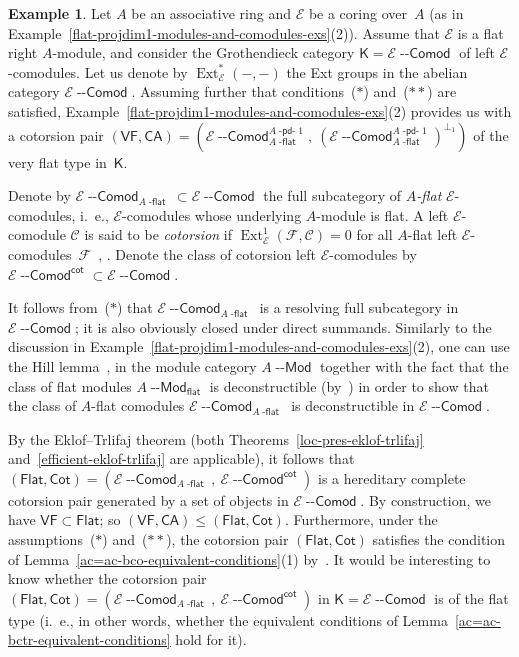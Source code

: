 \documentclass[12pt,a4paper]{amsart}
\newcommand{\+}{\nobreakdash-}
\renewcommand{\:}{\colon}
\DeclareMathOperator{\Ext}{Ext}
\newcommand{\Modl}{{\operatorname{\mathsf{--Mod}}}}
\newcommand{\Comodl}{{\operatorname{\mathsf{--Comod}}}}
\newcommand{\sK}{\mathsf K}
\newcommand{\cF}{\mathcal F}
\newcommand{\cC}{\mathcal C}
\newcommand{\cE}{\mathcal E}
\newcommand{\VF}{\mathsf{VF}}
\newcommand{\CA}{\mathsf{CA}}
\newcommand{\Flat}{\mathsf{Flat}}
\newcommand{\Cot}{\mathsf{Cot}}
\renewcommand{\flat}{\mathsf{flat}}
\renewcommand{\cot}{\mathsf{cot}}
\newcommand{\dpdo}{{{\operatorname{\mathsf{-pd-}}}1}}
\newcommand{\dflat}{{\operatorname{\mathsf{-flat}}}}
\theoremstyle{plain}
\theoremstyle{definition}
\newtheorem{ex}[thm]{Example}
\begin{document}
\begin{ex} \label{flat-cotorsion-pair-in-comodules-flat-type}
 Let $A$ be an associative ring and $\cE$ be a coring over~$A$
(as in Example~\ref{flat-projdim1-modules-and-comodules-exs}(2)).
 Assume that $\cE$ is a flat right $A$\+module, and consider
the Grothendieck category $\sK=\cE\Comodl$ of left $\cE$\+comodules.
 Let us denote by $\Ext_\cE^*({-},{-})$ the Ext groups in the abelian
category $\cE\Comodl$.
 Assuming further that conditions~($*$) and~(${*}{*}$) are
satisfied, Example~\ref{flat-projdim1-modules-and-comodules-exs}(2)
provides us with a cotorsion pair $(\VF,\CA)=
(\cE\Comodl^{A\dpdo}_{A\dflat},\allowbreak\>
(\cE\Comodl^{A\dpdo}_{A\dflat})^{\perp_1})$ of the very flat
type in~$\sK$.

 Denote by $\cE\Comodl_{A\dflat}\subset\cE\Comodl$ the full subcategory
of \emph{$A$\+flat} $\cE$\+comodules, i.~e., $\cE$\+comodules whose
underlying $A$\+module is flat.
 A left $\cE$\+comodule $\cC$ is said to be \emph{cotorsion} if
$\Ext_\cE^1(\cF,\cC)=0$ for all $A$\+flat left $\cE$\+comodules~$\cF$
\,\cite[Section~C.2]{Pcosh}, \cite[Section~5]{Pflcc}.
 Denote the class of cotorsion left $\cE$\+comodules by
$\cE\Comodl^\cot\subset\cE\Comodl$.

 It follows from~($*$) that $\cE\Comodl_{A\dflat}$ is a resolving full
subcategory in $\cE\Comodl$; it is also obviously closed under direct
summands.
 Similarly to the discussion in
Example~\ref{flat-projdim1-modules-and-comodules-exs}(2), one can
use the Hill lemma~\cite[Theorem~7.10]{GT},
\cite[Theorem~2.1]{Sto-hill} in the module category $A\Modl$
together with the fact that the class of flat modules $A\Modl_\flat$
is deconstructible (by~\cite[Section~2]{BBE}) in order to show that
the class of $A$\+flat comodules $\cE\Comodl_{A\dflat}$ is
deconstructible in $\cE\Comodl$.

 By the Eklof--Trlifaj theorem (both
Theorems~\ref{loc-pres-eklof-trlifaj}
and~\ref{efficient-eklof-trlifaj} are applicable), it follows that
$(\Flat,\Cot)=(\cE\Comodl_{A\dflat},\allowbreak\>\cE\Comodl^\cot)$ is
a hereditary complete cotorsion pair generated by a set of objects
in $\cE\Comodl$.
 By construction, we have $\VF\subset\Flat$; so $(\VF,\CA)\le
(\Flat,\Cot)$.
 Furthermore, under the assumptions~($*$) and~(${*}{*}$),
the cotorsion pair $(\Flat,\Cot)$ satisfies the condition
of Lemma~\ref{ac=ac-bco-equivalent-conditions}(1)
by~\cite[Corollary~5.5]{Pflcc}.
 It would be interesting to know whether the cotorsion pair
$(\Flat,\Cot)=(\cE\Comodl_{A\dflat},\allowbreak\>\cE\Comodl^\cot)$
in $\sK=\cE\Comodl$ is of the flat type (i.~e., in other words,
whether the equivalent conditions of
Lemma~\ref{ac=ac-bctr-equivalent-conditions} hold for it).
\end{ex}
\end{document}
